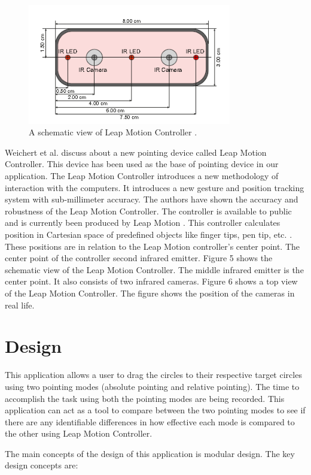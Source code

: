 \documentclass{article}
\begin{document}
\begin{figure}[!h]
\centering
\includegraphics[width=3.5in]{Figure_5}
\caption{A schematic view of Leap Motion Controller \cite{4}.}
\end{figure}

Weichert et al. \cite{4} discuss about a new pointing device called Leap Motion Controller. This device has been used as the base of pointing device in our application. The Leap Motion Controller introduces a new methodology of interaction with the computers. It introduces a new gesture and position tracking system with sub-millimeter accuracy. The authors have shown the accuracy and robustness of the Leap Motion Controller. The controller is available to public and is currently been produced by Leap Motion \cite{5}. This controller calculates position in Cartesian space of predefined objects like finger tips, pen tip, etc. \cite{4}. These positions are in relation to the Leap Motion controller’s center point. The center point of the controller second infrared emitter. Figure 5 shows the schematic view of the Leap Motion Controller. The middle infrared emitter is the center point. It also consists of two infrared cameras. Figure 6 shows a top view of the Leap Motion Controller. The figure shows the position of the cameras in real life.

\section{Design}
This application allows a user to drag the circles to their respective target circles using two pointing modes (absolute pointing and relative pointing). The time to accomplish the task using both the pointing modes are being recorded. This application can act as a tool to compare between the two pointing modes to see if there are any identifiable differences in how effective each mode is compared to the other using Leap Motion Controller. 

The main concepts of the design of this application is modular design. The key design concepts are:
\end{document}
